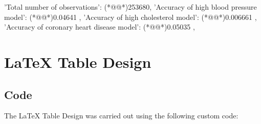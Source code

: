 \documentclass[11pt]{article}
\begin{document}
\begin{codeoutput}
{
    'Total number of observations': (*@@*)253680,
    'Accuracy of high blood pressure model': (*@@*)0.04641            ,
    'Accuracy of high cholesterol model': (*@@*)0.006661            ,
    'Accuracy of coronary heart disease model': (*@@*)0.05035            ,
}
\end{codeoutput}

\section{LaTeX Table Design}
\subsection{{Code}}
The LaTeX Table Design was carried out using the following custom code:
\end{document}

